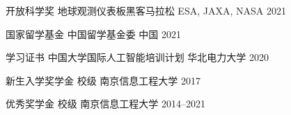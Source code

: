 


\begin{cvhonors}

  \cvhonor
    {开放科学奖} %
    {地球观测仪表板黑客马拉松} %
    {ESA, JAXA, NASA} %
    {2021} %

  \cvhonor
    {国家留学基金} %
    {中国留学基金委} %
    {中国} %
    {2021} %

  \cvhonor
    {学习证书} %
    {中国大学国际人工智能培训计划} %
    {华北电力大学} %
    {2020} %

  \cvhonor
    {新生入学奖学金} %
    {校级} %
    {南京信息工程大学} %
    {2017} %

  \cvhonor
    {优秀奖学金} %
    {校级} %
    {南京信息工程大学} %
    {2014--2021} %

\end{cvhonors}

